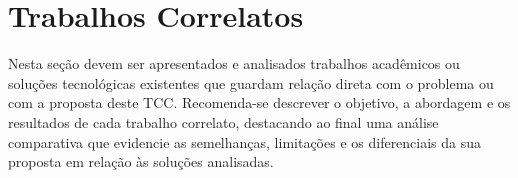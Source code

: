 \section{Trabalhos Correlatos}
Nesta seção devem ser apresentados e analisados trabalhos acadêmicos ou soluções tecnológicas existentes que guardam relação direta com o problema ou com a proposta deste TCC. Recomenda-se descrever o objetivo, a abordagem e os resultados de cada trabalho correlato, destacando ao final uma análise comparativa que evidencie as semelhanças, limitações e os diferenciais da sua proposta em relação às soluções analisadas.
